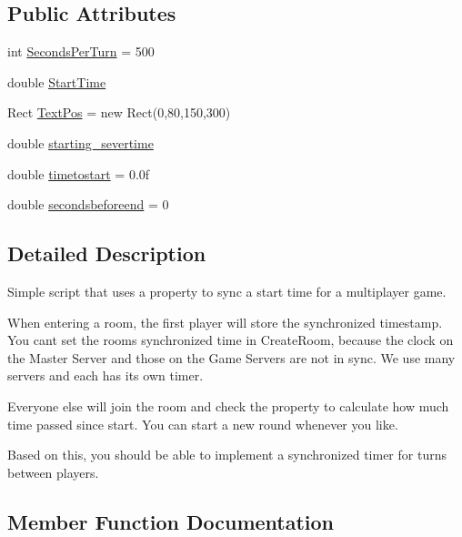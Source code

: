 \subsection*{Public Attributes}
\begin{DoxyCompactItemize}
\item 
int \hyperlink{class_in_room_round_timer_a3fbc46448a70dff996a45f508d3e3cc8}{Seconds\+Per\+Turn} = 500
\item 
double \hyperlink{class_in_room_round_timer_a22ba8013f8081643dfffeb95e049a97c}{Start\+Time}
\item 
Rect \hyperlink{class_in_room_round_timer_a1844d64936fc01a304de92179ac0cd4e}{Text\+Pos} = new Rect(0,80,150,300)
\item 
double \hyperlink{class_in_room_round_timer_a2399b0658c888b108f2c75f9d2fbb41c}{starting\+\_\+severtime}
\item 
double \hyperlink{class_in_room_round_timer_aa0c3ea404ae1bc85c1cc36626ae2bed8}{timetostart} = 0.\+0f
\item 
double \hyperlink{class_in_room_round_timer_a913c06f7ecff0d23be4041c9eb5fb69a}{secondsbeforeend} = 0
\end{DoxyCompactItemize}


\subsection{Detailed Description}
Simple script that uses a property to sync a start time for a multiplayer game. 

When entering a room, the first player will store the synchronized timestamp. You can\textquotesingle{}t set the room\textquotesingle{}s synchronized time in Create\+Room, because the clock on the Master Server and those on the Game Servers are not in sync. We use many servers and each has it\textquotesingle{}s own timer.

Everyone else will join the room and check the property to calculate how much time passed since start. You can start a new round whenever you like.

Based on this, you should be able to implement a synchronized timer for turns between players. 

\subsection{Member Function Documentation}
